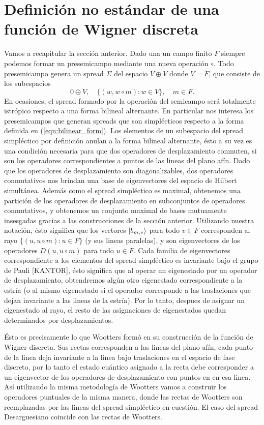 \documentclass[a4paper]{report}
\begin{document}
  \section{Definición no estándar de una función de Wigner
  discreta}

  Vamos a recapitular la sección anterior. Dado una un campo
  finito $F$ siempre podemos formar un presemicampo mediante
  una nueva operación $\circ$. Todo presemicampo genera un
  spread $\Sigma$ del espacio $V \oplus V$ donde $V = F$, que
  consiste de los subespacios
  \[
    0 \oplus V,
    \quad
    \{(w, w \circ m) : w \in V\}, 
    \quad m \in F.
  \] 
  En ocasiones, el spread formado por la operación del
  semicampo será totalmente istrópico respecto a una forma
  bilineal alternante. En particular nos interesa los
  presemicampos que generan spreads que son simplécticos
  respecto a la forma definida en (\ref{eqn:bilinear_form}).
  Los elementos de un subespacio del spread simpléctico por
  definición anulan a la forma bilineal alternante, ésto a
  su vez es una condición necesaria para que dos operadores
  de desplazamiento conmuten, si son los operadores
  correspondientes a puntos de las lineas del plano afín.
  Dado que los operadores de desplazamiento son
  diagonalizables, dos operadores conmutativos nos brindan
  una base de eigenvectores del espacio de Hilbert
  simultánea. Además como el spread simpléctico es maximal,
  obtenemos una partición de los operadores de
  desplazamiento en subconjuntos de operadores conmutativos,
  y obtenemos un conjunto maximal de bases mutuamente
  insesgadas gracias a las construcciones de la sección
  anterior. Utilizando nuestra notación, ésto significa que
  los vectores $\ket{b_{m,v}}$ para todo $v \in F$
  corresponden al rayo $\{(u, u \circ m) : u \in F\}$ (y sus
  lineas paralelas), y son eigenvectores de los operadores
  $D(u, u \circ m)$ para todo $u \in F$. Cada familia de
  eigenvectores correspondiente a los elementos del spread
  simpléctico es invariante bajo el grupo de Pauli [KANTOR],
  ésto significa que al operar un eigenestado por un
  operador de desplazamiento, obtendremos algún otro
  eigenestado correspondiente a la estría (o al mismo
  eigenestado si el operador corresponde a las traslaciones
  que dejan invariante a las lineas de la estría). Por lo
  tanto, despues de asignar un eigenestado al rayo, el resto
  de las asignaciones de eigenestados quedan determinados
  por desplazamientos.

  Ésto es precisamente lo que Wootters formó en su
  construcción de la función de Wigner discreta. Sus rectas
  corresponden a las lineas del plano afín, cada punto de la
  linea deja invariante a la linea bajo traslaciones en el
  espacio de fase discreto, por lo tanto el estado cuántico
  asignado a la recta debe corresponder a un eigenvector de
  los operadores de desplazamiento con puntos en en esa
  linea. Así utilizando la misma metodología de
  Wootters vamos a construir los operadores puntuales de la
  misma manera, donde las rectas de Wootters son
  reemplazadas por las lineas del spread simpléctico en
  cuestión. El caso del spread Desarguesiano coincide con
  las rectas de Wootters.
\end{document}
